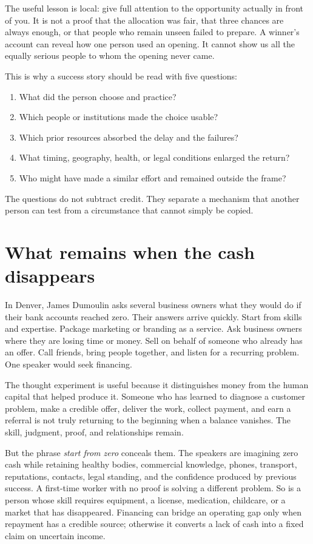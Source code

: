 The useful lesson is local: give full attention to the opportunity actually in
front of you. It is not a proof that the allocation was fair, that three chances
are always enough, or that people who remain unseen failed to prepare. A
winner's account can reveal how one person used an opening. It cannot show us
all the equally serious people to whom the opening never came.

This is why a success story should be read with five questions:

\begin{enumerate}
\item What did the person choose and practice?
\item Which people or institutions made the choice usable?
\item Which prior resources absorbed the delay and the failures?
\item What timing, geography, health, or legal conditions enlarged the return?
\item Who might have made a similar effort and remained outside the frame?
\end{enumerate}

The questions do not subtract credit. They separate a mechanism that another
person can test from a circumstance that cannot simply be copied.

\section{What remains when the cash disappears}

In Denver, James Dumoulin asks several business owners what they would do if
their bank accounts reached zero. Their answers arrive quickly. Start from
skills and expertise. Package marketing or branding as a service. Ask business
owners where they are losing time or money. Sell on behalf of someone who
already has an offer. Call friends, bring people together, and listen for a
recurring problem. One speaker would seek financing.

The thought experiment is useful because it distinguishes money from the human
capital that helped produce it. Someone who has learned to diagnose a customer
problem, make a credible offer, deliver the work, collect payment, and earn a
referral is not truly returning to the beginning when a balance vanishes. The
skill, judgment, proof, and relationships remain.

But the phrase \emph{start from zero} conceals them. The speakers are imagining
zero cash while retaining healthy bodies, commercial knowledge, phones,
transport, reputations, contacts, legal standing, and the confidence produced
by previous success. A first-time worker with no proof is solving a different
problem. So is a person whose skill requires equipment, a license, medication,
childcare, or a market that has disappeared. Financing can bridge an operating
gap only when repayment has a credible source; otherwise it converts a lack of
cash into a fixed claim on uncertain income.

